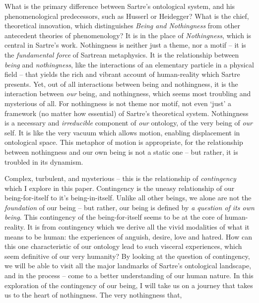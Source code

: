 
What is the primary difference between Sartre's ontological system, and his phenomenological predecessors, such as Husserl or Heidegger? What is the chief, theoretical innovation, which distinguishes \emph{Being and Nothingness} from other antecedent theories of phenomenology? It is in the place of \emph{Nothingness}, which is central in Sartre's work. Nothingness is neither just a theme, nor a motif -- it is the \emph{fundamental force} of Sartrean metaphysics. It is the relationship between \emph{being} and \emph{nothingness}, like the interactions of an elementary particle in a physical field -- that yields the rich and vibrant account of human-reality which Sartre presents. Yet, out of all interactions between being and nothingness, it is the interaction between \emph{our} being, and nothingness, which seems most troubling and mysterious of all. For nothingness is not theme nor motif, not even \enquote*{just} a framework (no matter how essential) of Sartre's theoretical system. Nothingness is a necessary and \emph{irreducible} component of \emph{our} ontology, of the very being of \emph{our} self. It is like the very vacuum which allows motion, enabling displacement in ontological space. This metaphor of motion is appropriate, for the relationship between nothingness and our own being is not a static one -- but rather, it is troubled in its dynamism.

Complex, turbulent, and mysterious -- this is the relationship of \emph{contingency} which I explore in this paper. Contingency is the uneasy relationship of our being-for-itself to it's being-in-itself. Unlike all other beings, we alone are not the \emph{foundation} of our being -- but rather, our being is defined by \emph{a question of its own being}. This contingency of the being-for-itself seems to be at the core of human-reality. It is from contingency which we derive all the vivid modalities of what it means to be human: the experiences of anguish, desire, love and hatred. How can this one characteristic of our ontology lead to such visceral experiences, which seem definitive of our very humanity? By looking at the question of contingency, we will be able to visit all the major landmarks of Sartre's ontological landscape, and in the process -- come to a better understanding of our human nature. In this exploration of the contingency of our being, I will take us on a journey that takes us to the heart of nothingness. The very nothingness that, 